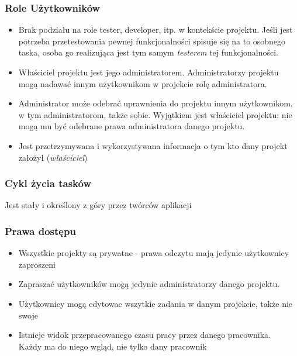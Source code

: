 \documentclass[a4paper,12pt,notitlepage]{mwrep}
\begin{document}
\subsubsection{Role Użytkowników}
\begin{itemize}
	\item	Brak podziału na role tester, developer, itp. w kontekście projektu.
			Jeśli jest potrzeba przetestowania pewnej funkcjonalności spisuje się na to osobnego taska,
			osoba go realizująca jest tym samym \emph{testerem} tej funkcjonalności.
	\item	Właściciel projektu jest jego administratorem. Administratorzy projektu mogą nadawać innym
			użytkownikom w projekcie rolę administratora.
	\item	Administrator może odebrać uprawnienia do projektu innym użytkownikom, w tym administratorom,
			także sobie. Wyjątkiem jest właściciel projektu: nie mogą mu być odebrane prawa administratora danego projektu.
	\item	Jest przetrzymywana i wykorzystywana informacja o tym kto dany projekt założył (\emph{właściciel})
\end{itemize}

\subsubsection{Cykl życia tasków}
Jest stały i określony z góry przez twórców aplikacji

\subsubsection{Prawa dostępu}
\begin{itemize}
	\item	Wszystkie projekty są prywatne - prawa odczytu mają jedynie użytkownicy zaproszeni
	\item	Zapraszać użytkowników mogą jedynie administratorzy danego projektu.
	\item	Użytkownicy mogą edytowac wszytkie zadania w danym projekcie, także nie swoje
	\item	Istnieje widok przepracowanego czasu pracy przez danego pracownika.\\
			Każdy ma do niego wgląd, nie tylko dany pracownik
\end{itemize}
\end{document}
